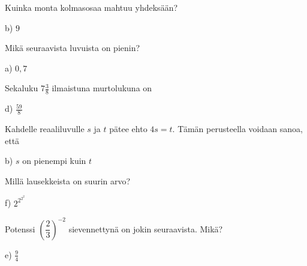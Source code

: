 \begin{multicols}{2}
\begin{tehtava}
Kuinka monta kolmasosaa mahtuu yhdeksään?
    \begin{vastaus}
	 b) $9$
    \end{vastaus}
\end{tehtava}

\begin{tehtava}
Mikä seuraavista luvuista on pienin?
    \begin{vastaus}
	 a) $0,7$
    \end{vastaus}
\end{tehtava}

\begin{tehtava} %
Sekaluku $7\frac{3}{8}$ ilmaistuna murtolukuna on
    \begin{vastaus}
	 d) $\frac{59}{8}$
    \end{vastaus}
\end{tehtava}

\begin{tehtava}
Kahdelle reaaliluvulle $s$ ja $t$ pätee ehto $4s=t$. Tämän perusteella voidaan sanoa, että
    \begin{vastaus}
	 b) $s$ on pienempi kuin $t$
    \end{vastaus}
\end{tehtava}

\begin{tehtava}
Millä lausekkeista on suurin arvo?
	\begin{vastaus}
	 f) $2^{2^{2^2}}$
	\end{vastaus}
\end{tehtava}

\begin{tehtava}
Potenssi $\left( \dfrac{2}{3} \right)^{-2}$ sievennettynä on jokin seuraavista. Mikä?
\begin{vastaus}
e) $\frac{9}{4}$
\end{vastaus}
\end{tehtava}


\end{multicols}
